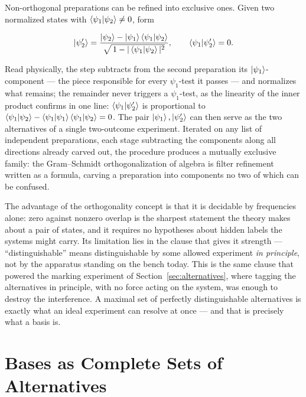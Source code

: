 Non-orthogonal preparations can be refined into exclusive ones. Given two normalized states with $\braket{\psi_1|\psi_2}\neq 0$, form
\begin{linenomath}
\begin{equation}
    \ket{\psi_2'}
    =
    \frac{\ket{\psi_2}-\ket{\psi_1}\braket{\psi_1|\psi_2}}
         {\sqrt{\,1-|\braket{\psi_1|\psi_2}|^2}},
    \qquad
    \braket{\psi_1|\psi_2'}=0 .
\end{equation}
\end{linenomath}
Read physically, the step subtracts from the second preparation its $\ket{\psi_1}$-component --- the piece responsible for every $\psi_1$-test it passes --- and normalizes what remains; the remainder never triggers a $\psi_1$-test, as the linearity of the inner product confirms in one line: $\braket{\psi_1|\psi_2'}$ is proportional to $\braket{\psi_1|\psi_2}-\braket{\psi_1|\psi_1}\braket{\psi_1|\psi_2}=0$. The pair $\ket{\psi_1},\ket{\psi_2'}$ can then serve as the two alternatives of a single two-outcome experiment. Iterated on any list of independent preparations, each stage subtracting the components along all directions already carved out, the procedure produces a mutually exclusive family: the Gram--Schmidt orthogonalization of algebra is filter refinement written as a formula, carving a preparation into components no two of which can be confused.

The advantage of the orthogonality concept is that it is decidable by frequencies alone: zero against nonzero overlap is the sharpest statement the theory makes about a pair of states, and it requires no hypotheses about hidden labels the systems might carry. Its limitation lies in the clause that gives it strength --- ``distinguishable'' means distinguishable by some allowed experiment \emph{in principle}, not by the apparatus standing on the bench today. This is the same clause that powered the marking experiment of Section~\ref{sec:alternatives}, where tagging the alternatives in principle, with no force acting on the system, was enough to destroy the interference. A maximal set of perfectly distinguishable alternatives is exactly what an ideal experiment can resolve at once --- and that is precisely what a basis is.

\section{Bases as Complete Sets of Alternatives}
\label{sec:bases}

